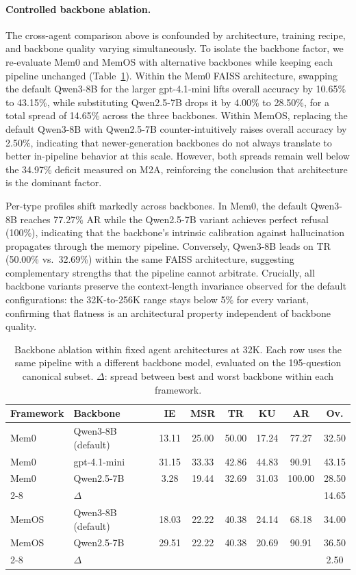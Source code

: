 \documentclass{article}
\begin{document}
\paragraph{Controlled backbone ablation.}
The cross-agent comparison above is confounded by architecture, training recipe, and backbone quality varying simultaneously. To isolate the backbone factor, we re-evaluate Mem0 and MemOS with alternative backbones while keeping each pipeline unchanged (Table~\ref{tab:backbone_ablation}). Within the Mem0 FAISS architecture, swapping the default Qwen3-8B for the larger gpt-4.1-mini lifts overall accuracy by 10.65\% to 43.15\%, while substituting Qwen2.5-7B drops it by 4.00\% to 28.50\%, for a total spread of 14.65\% across the three backbones. Within MemOS, replacing the default Qwen3-8B with Qwen2.5-7B counter-intuitively raises overall accuracy by 2.50\%, indicating that newer-generation backbones do not always translate to better in-pipeline behavior at this scale. However, both spreads remain well below the 34.97\% deficit measured on M2A, reinforcing the conclusion that architecture is the dominant factor.

Per-type profiles shift markedly across backbones. In Mem0, the default Qwen3-8B reaches 77.27\% AR while the Qwen2.5-7B variant achieves perfect refusal (100\%), indicating that the backbone's intrinsic calibration against hallucination propagates through the memory pipeline. Conversely, Qwen3-8B leads on TR (50.00\% vs.\ 32.69\%) within the same FAISS architecture, suggesting complementary strengths that the pipeline cannot arbitrate. Crucially, all backbone variants preserve the context-length invariance observed for the default configurations: the 32K-to-256K range stays below 5\% for every variant, confirming that flatness is an architectural property independent of backbone quality.

\begin{table}[h]
\centering
\small
\caption{Backbone ablation within fixed agent architectures at 32K.
Each row uses the same pipeline with a different backbone model,
evaluated on the 195-question canonical subset.
$\Delta$: spread between best and worst backbone within each framework.}
\label{tab:backbone_ablation}
\begin{tabular}{@{}llcccccc@{}}
\toprule
Framework & Backbone & IE & MSR & TR & KU & AR & Ov. \\
\midrule
Mem0 & Qwen3-8B (default) & 13.11 & 25.00 & 50.00 & 17.24 & 77.27 & 32.50 \\
Mem0 & gpt-4.1-mini & 31.15 & 33.33 & 42.86 & 44.83 & 90.91 & 43.15 \\
Mem0 & Qwen2.5-7B & 3.28 & 19.44 & 32.69 & 31.03 & 100.00 & 28.50 \\
\cmidrule{2-8}
& $\Delta$ & & & & & & 14.65 \\
\midrule
MemOS & Qwen3-8B (default) & 18.03 & 22.22 & 40.38 & 24.14 & 68.18 & 34.00 \\
MemOS & Qwen2.5-7B & 29.51 & 22.22 & 40.38 & 20.69 & 90.91 & 36.50 \\
\cmidrule{2-8}
& $\Delta$ & & & & & & 2.50 \\
\bottomrule
\end{tabular}
\end{table}
\end{document}
